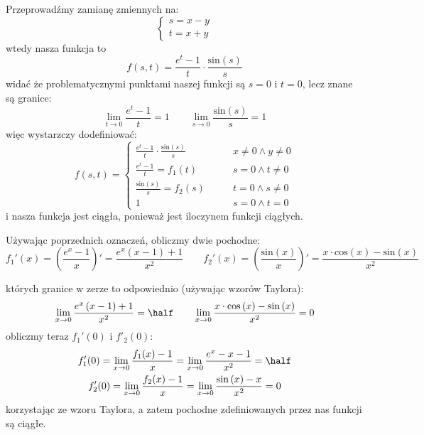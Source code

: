 \documentclass[11pt]{scrartcl}
\begin{document}
    \begin{walk}
        \item Przeprowadźmy zamianę zmiennych na:
          \[
            \begin{cases} s = x - y \\ t = x + y \end{cases}
          \]
          wtedy nasza funkcja to 
          \[
              f(s,t) = \frac{e^t - 1}{t} \cdot \frac{\text{sin} \left ( s \right ) }{s}
          \]
          widać że problematycznymi punktami naszej funkcji są $s = 0$ i $t = 0$, lecz znane są granice:
          \[
              \lim_{t \to 0} \frac{e^t - 1}{t} = 1 \qquad \lim_{s \to 0} \frac{\text{sin} \left ( s \right ) }{s} = 1    
          \]
          więc wystarzczy dodefiniować:
          \[
            f(s,t) = \begin{cases} \frac{e^t - 1}{t} \cdot \frac{\text{sin} \left ( s \right ) }{s} \qquad & x \not = 0 \wedge y \not = 0 \\  
              \frac{e^t - 1}{t} = f_1(t) \qquad & s = 0 \wedge t \not = 0 \\
              \frac{\text{sin} \left ( s \right ) }{s} = f_2 (s)  \qquad & t = 0 \wedge s \not = 0 \\
            1 \qquad & s = 0 \wedge t = 0 \end{cases}
          \]
          i nasza funkcja jest ciągła, ponieważ jest iloczynem funkcji ciągłych.

        \item Używając poprzednich oznaczeń, obliczmy dwie pochodne:
          \[
            f_1'(x) = \left ( \frac{e^x - 1}{x} \right )' = \frac{e^x (x - 1) + 1}{x^2} \qquad 
            f_2'(x) = \left ( \frac{\text{sin} \left ( x \right ) }{x} \right )' = \frac{x \cdot  \text{cos} \left ( x \right ) - \text{sin} \left ( x \right ) }{x^2}
          \]

          których granice w zerze to odpowiednio (używając wzorów Taylora):
          \[
              \lim_{x \to 0} \frac{e^x \left ( x - 1 \right ) + 1}{x^2} = \half \qquad 
              \lim_{x \to 0} \frac{x \cdot \text{cos} \left ( x \right ) - \text{sin} \left ( x \right ) }{x^2} = 0  
          \]
          obliczmy teraz $f_1'(0)$ i $f'_2(0)$:
          \begin{gather*}
              f'_1(0) = \lim_{x \to 0} \frac{f_1(x) - 1}{x} = \lim_{x \to 0} \frac{e^x - x - 1}{x^2} = \half \\
              f'_2(0) = \lim_{x \to 0} \frac{f_2(x) - 1}{x} = \lim_{x \to 0} \frac{\text{sin} \left ( x \right ) - x}{x^2} = 0    
          \end{gather*}
          korzystając ze wzoru Taylora, a zatem pochodne zdefiniowanych przez nas funkcji są ciągłe. 
          

\end{walk}
\end{document}
